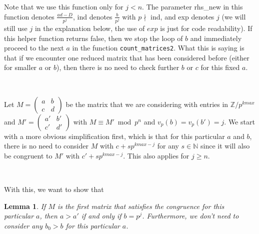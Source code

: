 \documentclass[letterpaper,12pt]{article}
\newtheorem{lemma}{Lemma}
\newcommand{\Z}{\mathbb{Z}}
\begin{document}
Note that we use this function only for $j < n$.
The parameter rhs\_new in this function denotes 
$\frac{ad-D}{p^j}$, ind denotes $\frac{b}{p^j}$ with 
$p \nmid $ ind, and exp denotes $j$ (we will still use $j$ in the explanation below, 
the use of $exp$ is just for code readability).
If this helper function returns false, then we stop the loop 
of $b$ and immediately proceed to the next $a$ in the function \texttt{count\_matrices2}.
What this is saying is that if we encounter one reduced matrix 
that has been considered before (either for smaller $a$ or $b$),
then there is no need to check further $b$ or $c$ for this fixed $a$.

\

Let $M = \begin{pmatrix} a & b \\ c & d \end{pmatrix}$ 
be the matrix that we are considering
with entries in $\Z / p^{kmax}$ and
$M' = \begin{pmatrix} a' & b' \\ c' & d' \end{pmatrix}$
with $M \equiv M' \bmod p^n$ and $v_p(b) = v_p(b') = j$.
We start with a more obvious simplification first, which is that 
for this particular $a$ and $b$,
there is no need to consider $M$ with $c + sp^{kmax-j}$ for any $s \in \mathbb{N}$
since it will also be congruent to $M'$ with $c' + sp^{kmax-j}$.
This also applies for $j \geq n$.

\

With this, we want to show that 
\begin{lemma}
If $M$ is the first matrix that satisfies the congruence for this particular $a$, then
$a > a'$ if and only if $b = p^j$.
Furthermore, we don't need to consider any $b_0 > b$ for this particular $a$.
\end{lemma}
\end{document}
